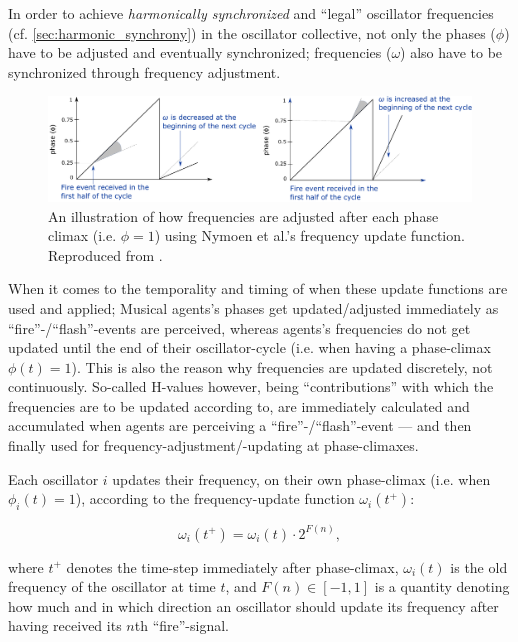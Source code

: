 	In order to achieve \textit{harmonically synchronized} and ``legal'' oscillator frequencies (cf. \ref{sec:harmonic_synchrony}) in the oscillator collective, not only the phases ($\phi$) have to be adjusted and eventually synchronized; frequencies ($\omega$) also have to be synchronized through frequency adjustment.
	
	\begin{figure}[ht!]
		\centering
		\includegraphics[width=\linewidth]{Assets/DocSegments/Chapters/Baseline/Figures/Illustrations/NymoenFrequencyAdjustment.pdf}
		\caption[]{An illustration of how frequencies are adjusted after each phase climax (i.e. $\phi=1$) using Nymoen et al.'s frequency update function. Reproduced from \cite{nymoen_synch}.}
		\label{fig:nymoen_freq_adjust_illustration}
	\end{figure}
	
	
	When it comes to the temporality and timing of when these update functions are used and applied; Musical agents's phases get updated/adjusted immediately as ``fire''-/``flash''-events are perceived, whereas agents's frequencies do not get updated until the end of their oscillator-cycle (i.e. when having a phase-climax $\phi(t)=1$). This is also the reason why frequencies are updated discretely, not continuously. So-called H-values however, being ``contributions'' with which the frequencies are to be updated according to, are immediately calculated and accumulated when agents are perceiving a ``fire''-/``flash''-event — and then finally used for frequency-adjustment/-updating at phase-climaxes.
	
	Each oscillator $i$ updates their frequency, on their own phase-climax (i.e. when $\phi_i(t)=1$), according to the frequency-update function $\omega_i(t^+)$:

	\begin{equation}
		\omega_i(t^+) = \omega_i(t) \cdot 2^{F(n)},
	\end{equation}

	where $t^+$ denotes the time-step immediately after phase-climax, $\omega_i(t)$ is the old frequency of the oscillator at time $t$, and $F(n) \in [-1,1]$ is a quantity denoting how much and in which direction an oscillator should update its frequency after having received its $n$th ``fire''-signal.

